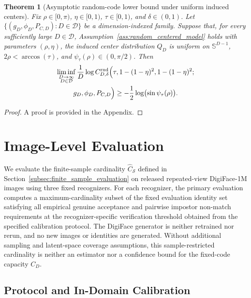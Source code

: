 \documentclass[journal]{IEEEtran}
\def\D{\mathrm{D}} %
\newtheorem{theorem}{Theorem}
\begin{document}
\begin{bibunit}
\begin{theorem}[Asymptotic random-code lower bound under uniform induced centers]
\label{thm:asymptotic_random_capacity_main}
%
Fix $\rho\in[0,\pi)$, $\eta\in[0,1)$, $\tau\in[0,1)$, and $\delta\in(0,1)$. Let $\{(g_D,\phi_D,P_{C,D}):D\in\mathcal D\}$ be a dimension-indexed family. Suppose that, for every sufficiently large $D\in\mathcal D$, Assumption~\ref{ass:random_centered_model} holds with parameters $(\rho,\eta)$, the induced center distribution $Q_D$ is uniform on $\mathbb S^{D-1}$, $2\rho<\arccos(\tau)$, and  $\psi_\tau(\rho)\in(0,\pi/2)$. Then
%
\begin{multline}
\liminf_{\substack{D\to\infty\\D\in\mathcal D}} \frac{1}{D}
\log C_{D,\delta}^{\mathrm{rnd}} \Bigl( \tau,1-(1-\eta)^2,1-(1-\eta)^2;\\ 
g_D,\phi_D,P_{C,D} \Bigr) \ge -\frac{1}{2} \log\bigl(\sin\psi_\tau(\rho)\bigr).
\label{eq:asymptotic_random_capacity_main}
\end{multline}
%
\end{theorem}

\begin{proof}
A proof is provided in the Appendix.
\end{proof}



\section{Image-Level Evaluation}
\label{sec:image_level_evaluation}

We evaluate the finite-sample cardinality $\widehat C_{\mathcal S}$ defined in Section~\ref{subsec:finite_sample_evaluation} on released repeated-view DigiFace-1M \cite{bae2023digiface1m} images using three fixed recognizers. For each recognizer, the primary evaluation computes a maximum-cardinality subset of the fixed evaluation identity set satisfying all empirical genuine acceptance and pairwise impostor non-match requirements at the recognizer-specific verification threshold obtained from the specified calibration protocol. The DigiFace generator is neither retrained nor rerun, and no new images or identities are generated. Without additional sampling and latent-space coverage assumptions, this sample-restricted cardinality is neither an estimator nor a confidence bound for the fixed-code capacity $C_D$.



\subsection{Protocol and In-Domain Calibration}


\end{bibunit}
\end{document}
